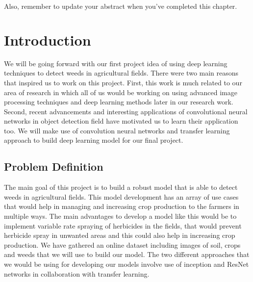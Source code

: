 \documentclass{report}
\begin{document}
Also, remember to update your abstract when you've completed this chapter. 
\fi

\section{Introduction}
We will be going forward with our first project idea of using deep learning techniques to detect weeds in agricultural fields. There were two main reasons that inspired us to work on this project. First, this work is much related to our area of research in which all of us would be working on using advanced image processing techniques and deep learning methods later in our research work. Second, recent advancements and interesting applications of convolutional neural networks in object detection field have motivated us to learn their application too. We will make use of convolution neural networks and transfer learning approach to build deep learning model for our final project. 

\subsection{Problem Definition}
The main goal of this project is to build a robust model that is able to detect weeds in agricultural fields. This model development has an array of use cases that would help in managing and increasing crop production to the farmers in multiple ways. The main advantages to develop a model like this would be to implement variable rate spraying of herbicides in the fields, that would prevent herbicide spray in unwanted areas and this could also help in increasing crop production. We have gathered an online dataset including images of soil, crops and weeds that we will use to build our model. The two different approaches that we would be using for developing our models involve use of inception and ResNet networks in collaboration with transfer learning.
\end{document}
